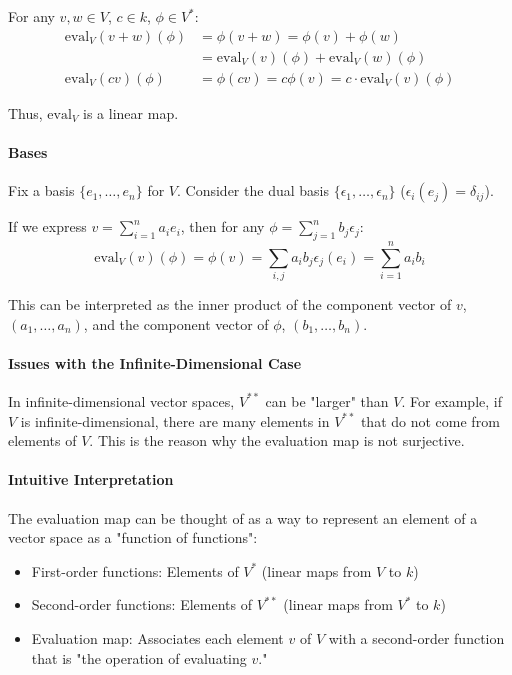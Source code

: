 \documentclass[uplatex,a4j,12pt,dvipdfmx]{jsarticle}
\begin{document}
For any $v, w \in V$, $c \in k$, $\phi \in V^*$:
\begin{align*}
	\mathrm{eval}_V(v + w)(\phi) & = \phi(v + w) = \phi(v) + \phi(w)                      \\
	                             & = \mathrm{eval}_V(v)(\phi) + \mathrm{eval}_V(w)(\phi)  \\
	\mathrm{eval}_V(cv)(\phi)    & = \phi(cv) = c\phi(v) = c\cdot\mathrm{eval}_V(v)(\phi)
\end{align*}

Thus, $\mathrm{eval}_V$ is a linear map.

\paragraph{Bases}

Fix a basis $\{e_1, \ldots, e_n\}$ for $V$. Consider the dual basis $\{\epsilon_1, \ldots, \epsilon_n\}$ ($\epsilon_i(e_j) = \delta_{ij}$).

If we express $v = \sum_{i=1}^n a_i e_i$, then for any $\phi = \sum_{j=1}^n b_j \epsilon_j$:
\[
	\mathrm{eval}_V(v)(\phi) = \phi(v) = \sum_{i,j} a_i b_j \epsilon_j(e_i) = \sum_{i=1}^n a_i b_i
\]

This can be interpreted as the inner product of the component vector of $v$, $(a_1, \ldots, a_n)$, and the component vector of $\phi$, $(b_1, \ldots, b_n)$.

\paragraph{Issues with the Infinite-Dimensional Case}

In infinite-dimensional vector spaces, $V^{**}$ can be "larger" than $V$. For example, if $V$ is infinite-dimensional, there are many elements in $V^{**}$ that do not come from elements of $V$. This is the reason why the evaluation map is not surjective.

\paragraph{Intuitive Interpretation}

The evaluation map can be thought of as a way to represent an element of a vector space as a "function of functions":
\begin{itemize}
	\item First-order functions: Elements of $V^*$ (linear maps from $V$ to $k$)
	\item Second-order functions: Elements of $V^{**}$ (linear maps from $V^*$ to $k$)
	\item Evaluation map: Associates each element $v$ of $V$ with a second-order function that is "the operation of evaluating $v$."
\end{itemize}
\end{document}
